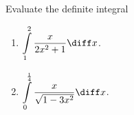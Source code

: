 Evaluate the definite integral 
\begin{enumerate}
\item $\displaystyle\int\limits_{1}^{2} \frac{x}{2x^2+1 }  \diff x$.

\item $\displaystyle\int\limits_{0}^{\frac{1}4}\frac{x }{\sqrt{1-3x^2}}\diff x$.

\end{enumerate}
